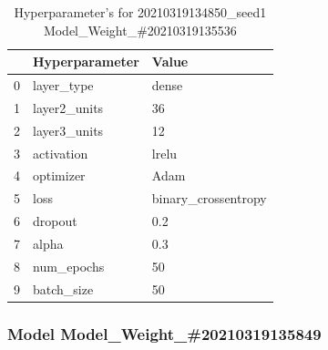 \begin{table}
\centering
\caption{Hyperparameter's for 20210319134850\_seed1 Model\_Weight\_\#20210319135536}
\label{tab:hyp20210319134850seed1ModelWeight20210319135536}
\begin{tabular}{lll}
\toprule
{} & Hyperparameter &                Value \\
\midrule
0 &     layer\_type &                dense \\
1 &   layer2\_units &                   36 \\
2 &   layer3\_units &                   12 \\
3 &     activation &                lrelu \\
4 &      optimizer &                 Adam \\
5 &           loss &  binary\_crossentropy \\
6 &        dropout &                  0.2 \\
7 &          alpha &                  0.3 \\
8 &     num\_epochs &                   50 \\
9 &     batch\_size &                   50 \\
\bottomrule
\end{tabular}
\end{table}
\subsubsection{Model Model\_Weight\_\#20210319135849}

